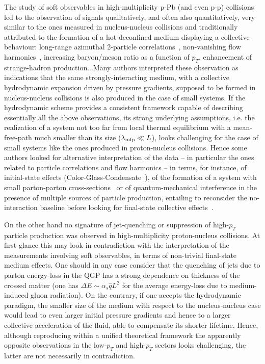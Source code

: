 The study of soft observables in high-multiplicity p-Pb (and even p-p) collisions led to the observation of signals qualitatively, and often also quantitatively, very similar to the ones measured in nucleus-nucleus collisions and traditionally attributed to the formation of a hot deconfined medium displaying a collective behaviour: long-range azimuthal 2-particle correlations~\cite{Khachatryan:2010gv,CMS:2012qk,Abelev:2012ola,Aad:2012gla}, non-vanishing flow harmonics~\cite{ABELEV:2013wsa,Khachatryan:2015waa}, increasing baryon/meson ratio as a function of $p_T$, enhancement of strange-hadron production...Many authors interpreted these observation as indications that the same strongly-interacting medium, with a collective hydrodynamic expansion driven by pressure gradients, supposed to be formed in nucleus-nucleus collisions is also produced in the case of small systems. If the hydrodynamic scheme provides a consistent framework capable of describing essentially all the above observations, its strong underlying assumptions, i.e. the realization of a system not too far from local thermal equilibrium with a mean-free-path much smaller than its size ($\lambda_{\rm mfp}\ll L$), looks challenging for the case of small systems like the ones produced in proton-nucleus collisions. Hence some authors looked for alternative interpretation of the data -- in particular the ones related to particle correlations and flow harmonics -- in terms, for instance, of initial-state effects (Color-Glass-Condensate~\cite{Dusling:2013qoz}), of the formation of a system with small parton-parton cross-sections~\cite{Bzdak:2014dia} or of quantum-mechanical interference in the presence of multiple sources of particle production, entailing to reconsider the no-interaction baseline before looking for final-state collective effects~\cite{Blok:2017pui}.

On the other hand no signature of jet-quenching or suppression of high-$p_T$ particle production was observed in high-multiplicity proton-nucleus collisions. At first glance this may look in contradiction with the interpretation of the  measurements involving soft observables, in terms of non-trivial final-state medium effects. One should in any case consider that the quenching of jets due to parton energy-loss in the QGP has a strong dependence on thickness of the crossed matter (one has $\Delta E\sim \alpha_s\hat q L^2$ for the average energy-loss due to medium-induced gluon radiation). On the contrary, if one accepts the hydrodynamic paradigm, the smaller size of the medium with respect to the nucleus-nucleus case would lead to even larger initial pressure gradients and hence to a larger collective acceleration of the fluid, able to compensate its shorter lifetime. Hence, although reproducing within a unified theoretical framework the apparently opposite observations in the low-$p_T$ and high-$p_T$ sectors looks challenging, the latter are not necessarily in contradiction.

